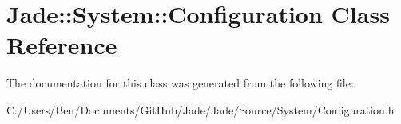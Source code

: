 \hypertarget{class_jade_1_1_system_1_1_configuration}{}\section{Jade\+:\+:System\+:\+:Configuration Class Reference}
\label{class_jade_1_1_system_1_1_configuration}


The documentation for this class was generated from the following file\+:\begin{DoxyCompactItemize}
\item 
C\+:/\+Users/\+Ben/\+Documents/\+Git\+Hub/\+Jade/\+Jade/\+Source/\+System/Configuration.\+h\end{DoxyCompactItemize}
